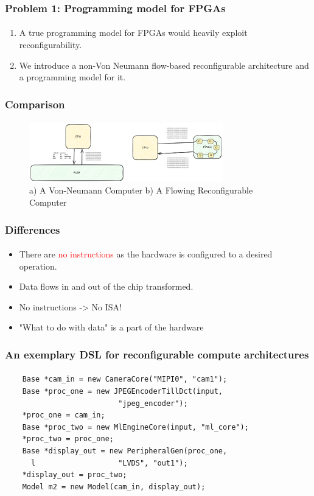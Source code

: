 \documentclass{beamer}
\begin{document}
{\begin{frame}[fragile]
\end{frame}


\begin{frame}[fragile]
\frametitle{Problem 1: Programming model for FPGAs}
\framesubtitle{}
  \begin{enumerate}
    \item A true programming model for FPGAs would heavily exploit
      reconfigurability.
    \item We introduce a non-Von Neumann flow-based reconfigurable architecture and a programming model
      for it.
  \end{enumerate}
\end{frame}

\begin{frame}[fragile]
  \frametitle{Comparison}
  \framesubtitle{}
  \begin{figure}
    \centering
    \includegraphics[width=0.75\textwidth]{flow.png}
    \caption{a) A Von-Neumann Computer b) A Flowing Reconfigurable Computer}
    \label{}
  \end{figure}
\end{frame}

\begin{frame}[fragile]
  \frametitle{Differences}
  \framesubtitle{}

  \begin{itemize}
    \item There are \textcolor{red}{no instructions} as the hardware
  is configured to a desired operation. 
      
    \item Data flows in and out of the chip transformed. 

    \item No instructions -> No ISA!

    \item "What to do with data" is a part of the hardware
  \end{itemize}
\end{frame}

\begin{frame}[fragile]
  \frametitle{An exemplary DSL for reconfigurable compute architectures}
\framesubtitle{}
  \begin{verbatim}
    Base *cam_in = new CameraCore("MIPI0", "cam1");
    Base *proc_one = new JPEGEncoderTillDct(input, 
                          "jpeg_encoder");
    *proc_one = cam_in;
    Base *proc_two = new MlEngineCore(input, "ml_core");
    *proc_two = proc_one;
    Base *display_out = new PeripheralGen(proc_one, 
      l                   "LVDS", "out1");
    *display_out = proc_two;
    Model m2 = new Model(cam_in, display_out);
  \end{verbatim}
\end{frame}

}
\end{document}
